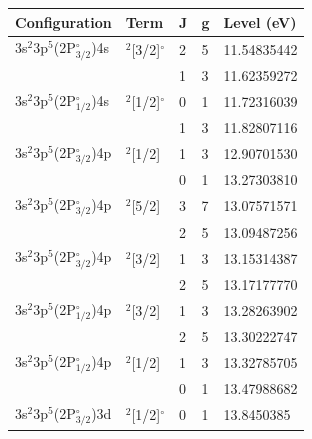 \begin{table}[]
\footnotesize
\centering
\begin{tabular}{lllll}
\hline \hline
Configuration    & Term        & J & g & Level (eV) \\ \hline \hline
3s$^\text{2}$3p$^\text{5}$(2P$^{\circ}_\text{3/2}$)4s & $^\text{2}${[}3/2{]}$^{\circ}$ & 2 & 5 & 11.54835442                                            \\
                 &             & 1 & 3 & 11.62359272                                            \\
3s$^\text{2}$3p$^\text{5}$(2P$^{\circ}_\text{1/2}$)4s & $^\text{2}${[}1/2{]}$^{\circ}$ & 0 & 1 & 11.72316039                                            \\
                 &             & 1 & 3 & 11.82807116                                            \\ \hline
3s$^\text{2}$3p$^\text{5}$(2P$^{\circ}_\text{3/2}$)4p & $^\text{2}${[}1/2{]}  & 1 & 3 & 12.90701530                                            \\
                 &             & 0 & 1 & 13.27303810                                            \\
3s$^\text{2}$3p$^\text{5}$(2P$^{\circ}_\text{3/2}$)4p & $^\text{2}${[}5/2{]}  & 3 & 7 & 13.07571571                                            \\
                 &             & 2 & 5 & 13.09487256                                            \\
3s$^\text{2}$3p$^\text{5}$(2P$^{\circ}_\text{3/2}$)4p & $^\text{2}${[}3/2{]}  & 1 & 3 & 13.15314387                                            \\
                 &             & 2 & 5 & 13.17177770                                            \\
3s$^\text{2}$3p$^\text{5}$(2P$^{\circ}_\text{1/2}$)4p & $^\text{2}${[}3/2{]}  & 1 & 3 & 13.28263902                                            \\
                 &             & 2 & 5 & 13.30222747                                            \\
3s$^\text{2}$3p$^\text{5}$(2P$^{\circ}_\text{1/2}$)4p & $^\text{2}${[}1/2{]}  & 1 & 3 & 13.32785705                                            \\
                 &             & 0 & 1 & 13.47988682                                            \\ \hline
3s$^\text{2}$3p$^\text{5}$(2P$^{\circ}_\text{3/2}$)3d & $^\text{2}${[}1/2{]}$^{\circ}$ & 0 & 1 & 13.8450385                                             \\

\end{tabular}
\end{table}
